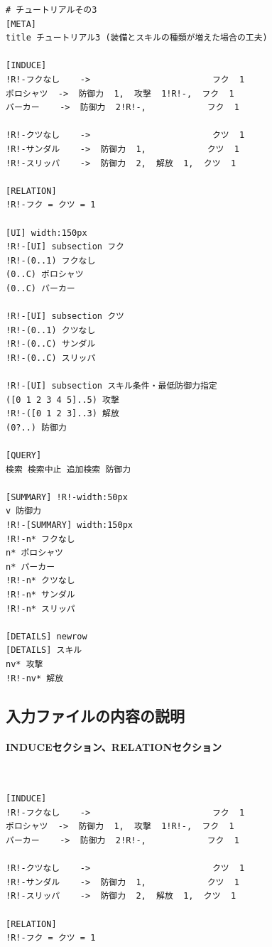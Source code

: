 \documentclass[dvipdfmx]{jsarticle}
\begin{document}
{\footnotesize\begin{mdframed}\begin{Verbatim}[commandchars=!<>]
# チュートリアルその3
[META]
title チュートリアル3 (装備とスキルの種類が増えた場合の工夫)

[INDUCE]
!R!-フクなし    ->                        フク  1   
ポロシャツ  ->  防御力  1,  攻撃  1!R!-,  フク  1
パーカー    ->  防御力  2!R!-,            フク  1
                                   
!R!-クツなし    ->                        クツ  1
!R!-サンダル    ->  防御力  1,            クツ  1
!R!-スリッパ    ->  防御力  2,  解放  1,  クツ  1

[RELATION]
!R!-フク = クツ = 1

[UI] width:150px
!R!-[UI] subsection フク
!R!-(0..1) フクなし
(0..C) ポロシャツ
(0..C) パーカー

!R!-[UI] subsection クツ
!R!-(0..1) クツなし
!R!-(0..C) サンダル
!R!-(0..C) スリッパ

!R!-[UI] subsection スキル条件・最低防御力指定
([0 1 2 3 4 5]..5) 攻撃
!R!-([0 1 2 3]..3) 解放
(0?..) 防御力

[QUERY]
検索 検索中止 追加検索 防御力

[SUMMARY] !R!-width:50px
v 防御力
!R!-[SUMMARY] width:150px
!R!-n* フクなし
n* ポロシャツ
n* パーカー
!R!-n* クツなし
!R!-n* サンダル
!R!-n* スリッパ

[DETAILS] newrow
[DETAILS] スキル
nv* 攻撃
!R!-nv* 解放
\end{Verbatim}
\end{mdframed}}

\subsection{入力ファイルの内容の説明}

\paragraph{INDUCEセクション、RELATIONセクション}~\medskip
{\footnotesize\begin{mdframed}\begin{Verbatim}[commandchars=!<>]
[INDUCE]
!R!-フクなし    ->                        フク  1   
ポロシャツ  ->  防御力  1,  攻撃  1!R!-,  フク  1
パーカー    ->  防御力  2!R!-,            フク  1
                                   
!R!-クツなし    ->                        クツ  1
!R!-サンダル    ->  防御力  1,            クツ  1
!R!-スリッパ    ->  防御力  2,  解放  1,  クツ  1

[RELATION]
!R!-フク = クツ = 1
\end{Verbatim}
\end{mdframed}}
\medskip
\end{document}
